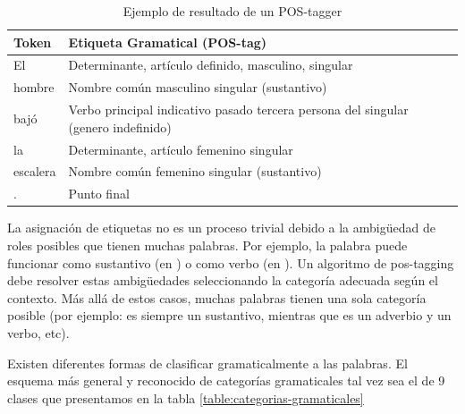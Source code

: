 \begin{center}
\begin{table}
\begin{tabular}{| l | l |}
 \hline
Token & Etiqueta Gramatical (POS-tag) \\ \hline
El  & Determinante, artículo definido, masculino, singular\\ \hline
hombre &  Nombre común masculino singular (sustantivo) \\ \hline
bajó  & Verbo principal indicativo pasado tercera persona del singular (genero indefinido)\\ \hline
la  & Determinante, artículo femenino singular \\ \hline
escalera & Nombre común femenino singular (sustantivo) \\ \hline
.  & Punto final\\ \hline
\end{tabular}
\caption{Ejemplo de resultado de un POS-tagger}
\label{table:ejemplos-postagger}
\end{table}
\end{center}

La asignación de etiquetas no es un proceso trivial debido a la ambigüedad de roles posibles que tienen muchas palabras. Por ejemplo, la palabra
 puede funcionar como sustantivo (en ) o como verbo (en ).
Un algoritmo de pos-tagging debe resolver estas ambigüedades seleccionando la categoría adecuada según el contexto. Más allá de estos casos, muchas palabras tienen una sola categoría posible (por ejemplo:  es siempre un sustantivo, mientras que  es un adverbio y  un verbo, etc).

Existen diferentes formas de clasificar gramaticalmente a las palabras. El esquema más general y reconocido de categorías gramaticales tal vez sea el de 9 clases que presentamos en la tabla \ref{table:categorias-gramaticales}

